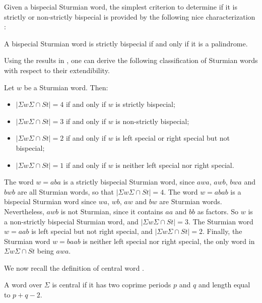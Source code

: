 \documentclass{llncs}
\newcommand{\St}{\textit{St}}
\begin{document}
Given a bispecial Sturmian word, the simplest criterion to determine if it is strictly or non-strictly bispecial  is provided by the following nice characterization \cite{DelMi94}:

\begin{proposition}\label{prop:sturmstrispe}
 A bispecial Sturmian word is strictly bispecial if and only if it is a palindrome.
\end{proposition}

Using the results in \cite{DelMi94}, one can derive the following classification of Sturmian words with respect to their extendibility.

\begin{proposition}\label{prop:bisp}
 Let $w$ be a Sturmian word. Then:
 
\begin{itemize}
\item  $|\Sigma w\Sigma\cap \St|=4$ if and only if $w$ is strictly bispecial;
\item  $|\Sigma w\Sigma\cap \St|=3$ if and only if $w$ is non-strictly bispecial;
\item  $|\Sigma w\Sigma\cap \St|=2$ if and only if $w$ is left special or right special but not bispecial;
\item  $|\Sigma w\Sigma\cap \St|=1$ if and only if $w$ is neither left special nor right special.
\end{itemize}
\end{proposition}

\begin{example}
The word $w=aba$ is a strictly bispecial Sturmian word, since $awa$, $awb$, $bwa$ and $bwb$ are all Sturmian words, so that $|\Sigma w\Sigma\cap \St|=4$. The word $w=abab$ is a bispecial Sturmian word since $wa$, $wb$, $aw$ and $bw$ are Sturmian words. Nevertheless, $awb$ is not Sturmian, since it contains $aa$ and $bb$ as factors. So $w$ is a non-strictly bispecial Sturmian word, and $|\Sigma w\Sigma\cap \St|=3$. The Sturmian word $w=aab$ is left special but not right special, and $|\Sigma w\Sigma\cap \St|=2$. Finally, the Sturmian word $w=baab$ is neither left special nor right special, the only word in $\Sigma w\Sigma\cap \St$ being $awa$.
\end{example}

We now recall the definition of central word \cite{DelMi94}.

\begin{definition}
A word over $\Sigma$ is central if it has two coprime periods $p$ and $q$ and length equal to $p+q-2$.
\end{definition}
\end{document}
